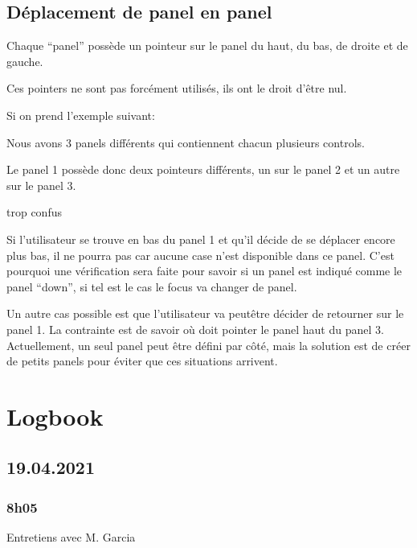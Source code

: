 \documentclass[a4paper,12pt,french]{sphinxmanual}
\begin{document}
\section{Déplacement de panel en panel}
\label{\detokenize{fonctionnelleInterface:deplacement-de-panel-en-panel}}
\sphinxAtStartPar
Chaque “panel” possède un pointeur sur le panel du haut, du bas, de droite et de gauche.

\sphinxAtStartPar
Ces pointers ne sont pas forcément utilisés, ils ont le droit d’être nul.

\sphinxAtStartPar
Si on prend l’exemple suivant:

\sphinxAtStartPar
{}

\sphinxAtStartPar
Nous avons 3 panels différents qui contiennent chacun plusieurs controls.

\sphinxAtStartPar
Le panel 1 possède donc deux pointeurs différents, un sur le panel 2 et un autre sur le panel 3.

\sphinxAtStartPar
trop confus

\sphinxAtStartPar
Si l’utilisateur se trouve en bas du panel 1 et qu’il décide de se déplacer encore plus  bas, il ne pourra pas car aucune case n’est disponible dans ce panel. C’est pourquoi une vérification  sera faite pour savoir si un panel est indiqué comme le panel “down”, si tel est le cas le focus va changer de panel.

\sphinxAtStartPar
Un autre cas possible est que l’utilisateur va peut\sphinxhyphen{}être décider de retourner sur le panel 1. La contrainte est de savoir où doit pointer le panel haut du panel 3. Actuellement, un seul panel peut être défini par côté, mais la solution est de créer de petits panels pour éviter que ces situations arrivent.


\chapter{Logbook}
\label{\detokenize{logbook:logbook}}\label{\detokenize{logbook::doc}}

\section{19.04.2021}
\label{\detokenize{logbook:id1}}

\subsection{8h05}
\label{\detokenize{logbook:h05}}
\sphinxAtStartPar
Entretiens avec M. Garcia
\end{document}
